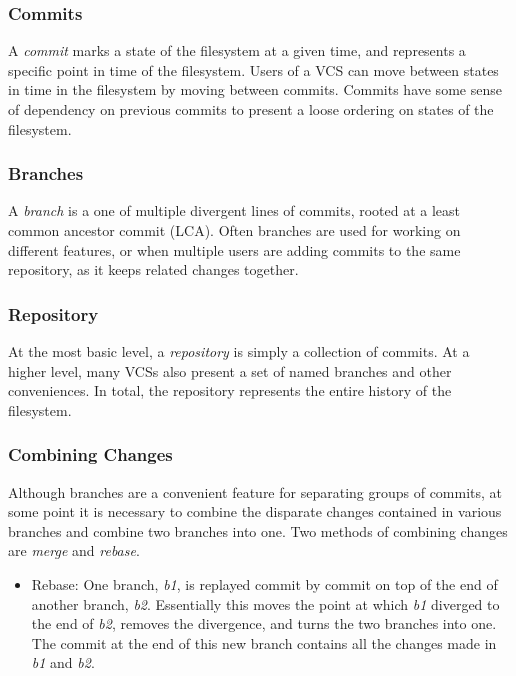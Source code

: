 \documentclass[]{article}
\begin{document}
\subsubsection{Commits}

A \emph{commit} marks a state of the filesystem at a given time, and
represents a specific point in time of the filesystem. Users of a VCS
can move between states in time in the filesystem by moving between
commits. Commits have some sense of dependency on previous commits to
present a loose ordering on states of the filesystem.

\subsubsection{Branches}

A \emph{branch} is a one of multiple divergent lines of commits, rooted
at a least common ancestor commit (LCA). Often branches are used for
working on different features, or when multiple users are adding commits
to the same repository, as it keeps related changes together.

\subsubsection{Repository}

At the most basic level, a \emph{repository} is simply a collection of
commits. At a higher level, many VCSs also present a set of named
branches and other conveniences. In total, the repository represents the
entire history of the filesystem.

\subsubsection{Combining Changes}

Although branches are a convenient feature for separating groups of
commits, at some point it is necessary to combine the disparate changes
contained in various branches and combine two branches into one. Two
methods of combining changes are \emph{merge} and \emph{rebase}.

\begin{itemize}
\item
  Rebase: One branch, \emph{b1}, is replayed commit by commit on top of
  the end of another branch, \emph{b2}. Essentially this moves the point
  at which \emph{b1} diverged to the end of \emph{b2}, removes the
  divergence, and turns the two branches into one. The commit at the end
  of this new branch contains all the changes made in \emph{b1} and
  \emph{b2}.
\end{itemize}
\end{document}
